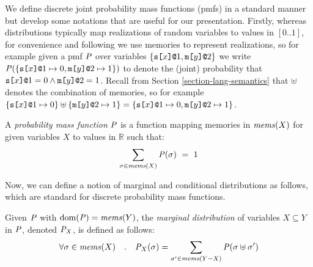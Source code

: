 We define discrete joint probability mass functions (pmfs) in a
standard manner but develop some notations that are useful for our
presentation. Firstly, whereas distributions typically map
realizations of random variables to values in $[0..1]$, for
convenience and following \cite{barthe2019probabilistic} we use
memories to represent realizations, so for example given a pmf $\mathit{P}$
over variables $\{ \texttt{s[}x\texttt{]}\texttt{@}1, \texttt{m[}y\texttt{]}\texttt{@}2 \}$ we write $\mathit{P}(\{
\texttt{s[}x\texttt{]}\texttt{@}1 \mapsto 0, \texttt{m[}y\texttt{]}\texttt{@}2 \mapsto 1 \})$ to
denote the (joint) probability that $\texttt{s[}x\texttt{]}\texttt{@}1 = 0 \wedge
\texttt{m[}y\texttt{]}\texttt{@}2 = 1$. Recall from Section
\ref{section-lang-semantics} that $\uplus$ denotes the combination of
memories, so for example $\{ \texttt{s[}x\texttt{]}\texttt{@}1 \mapsto 0\} \uplus
\{\texttt{m[}y\texttt{]}\texttt{@}2 \mapsto 1 \} = \{ \texttt{s[}x\texttt{]}\texttt{@}1 \mapsto 0,
\texttt{m[}y\texttt{]}\texttt{@}2 \mapsto 1 \}$.
\begin{definition}
  A \emph{probability mass function} $\mathit{P}$ is a function
  mapping memories in $\mathit{mems}(X)$ for given variables $X$ to
  values in $\mathbb{R}$ such that:
  $$
  \sum_{\sigma \in \mathit{mems}(X)} \mathit{P}(\sigma) \  = \ 1
  $$
\end{definition}
Now, we can define a notion of marginal and conditional
distributions as follows, which are standard for discrete
probability mass functions. 
\begin{definition}
  Given $\mathit{P}$ with $\mathrm{dom}(\mathit{P}) = \mathit{mems}(Y)$, the \emph{marginal distribution}
  of variables $X \subseteq Y$ in $\mathit{P}$, denoted ${\mathit{P}}_{X}$, is defined as follows:
  $$
  \forall \sigma \in \mathit{mems}(X) \quad . \quad {\mathit{P}}_{X}(\sigma) =
  \sum_{\sigma' \in \mathit{mems}(Y-X)} \mathit{P}(\sigma \uplus \sigma')
  $$
\end{definition}

